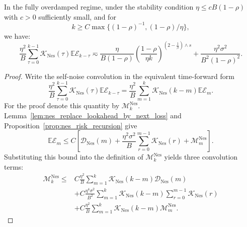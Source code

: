 \begin{proposition}
\label{prop:nes_self_noise_bounds0}
In the fully overdamped regime, under the stability condition \(\eta\le cB(1-\rho)\) with \(c>0\) sufficiently small, and for 
\[
    k\ge C\max\{(1-\rho)^{-1},(1-\rho)/\eta\},
\]
we have:
\[
    \frac{\eta^2}{B}\sum_{\tau=0}^{k-1}\mathcal K_{\mathrm{Nes}}(\tau)\mathbb{E}\mathcal E_{k-\tau}
    \eqsim
    \frac{\eta}{B(1-\rho)}
    \left(\frac{1-\rho}{\eta k}\right)^{(2-\frac1\beta)\wedge s} + \frac{\eta^2\sigma^2}{B^2(1-\rho)^2}.
\]
\end{proposition}

\begin{proof}
Write the self-noise convolution in the equivalent time-forward form
\[
    \frac{\eta^2}{B}
    \sum_{\tau=0}^{k-1}\mathcal K_{\mathrm{Nes}}(\tau)
    \mathbb{E}\mathcal E_{k-\tau}
    =
    \frac{\eta^2}{B}
    \sum_{m=1}^{k}\mathcal K_{\mathrm{Nes}}(k-m)
    \mathbb{E}\mathcal E_m.
\]
For the proof denote this quantity by \(\mathcal M_k^{\mathrm{Nes}}\).  Lemma~\ref{lem:nes_replace_lookahead_by_next_loss} and Proposition~\ref{prop:nes_risk_recursion} give
\[
    \mathbb{E}\mathcal E_m
    \le
    C\left[
        \mathcal D_{\mathrm{Nes}}(m)
        +
        \frac{\eta^2\sigma^2}{B}
        \sum_{r=0}^{m-1}\mathcal K_{\mathrm{Nes}}(r)
        +
        \mathcal M_m^{\mathrm{Nes}}
    \right].
\]
Substituting this bound into the definition of $\mathcal M_k^{\mathrm{Nes}}$ yields three convolution terms:
\begin{align}
\label{eq:nes_prop_bootstrap_start}
    \mathcal M_k^{\mathrm{Nes}}
    \le{}&
    C\frac{\eta^2}{B}\sum_{m=1}^{k}
        \mathcal K_{\mathrm{Nes}}(k-m)\mathcal D_{\mathrm{Nes}}(m) \nonumber \\
    & + C\frac{\eta^4\sigma^2}{B^2}\sum_{m=1}^{k}\mathcal K_{\mathrm{Nes}}(k-m)\sum_{r=0}^{m-1}\mathcal K_{\mathrm{Nes}}(r) \nonumber \\
    & + C\frac{\eta^2}{B}\sum_{m=1}^{k}
        \mathcal K_{\mathrm{Nes}}(k-m)\mathcal M_m^{\mathrm{Nes}} .
\end{align}


\end{proof}
